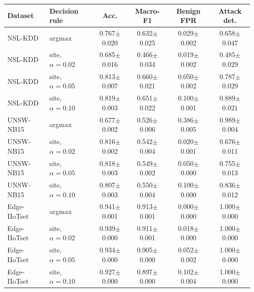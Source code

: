 \begin{tabular}{llcccc}
\toprule
Dataset & Decision rule & Acc. & Macro-F1 & Benign FPR & Attack det. \\
\midrule
NSL-KDD & argmax & 0.767$\pm$0.020 & 0.632$\pm$0.025 & 0.029$\pm$0.002 & 0.658$\pm$0.047 \\
NSL-KDD & site, $\alpha=0.02$ & 0.685$\pm$0.016 & 0.466$\pm$0.034 & 0.019$\pm$0.002 & 0.485$\pm$0.029 \\
NSL-KDD & site, $\alpha=0.05$ & 0.813$\pm$0.007 & 0.660$\pm$0.021 & 0.050$\pm$0.002 & 0.787$\pm$0.029 \\
NSL-KDD & site, $\alpha=0.10$ & 0.819$\pm$0.003 & 0.651$\pm$0.022 & 0.100$\pm$0.001 & 0.889$\pm$0.021 \\
UNSW-NB15 & argmax & 0.677$\pm$0.002 & 0.526$\pm$0.006 & 0.386$\pm$0.005 & 0.989$\pm$0.004 \\
UNSW-NB15 & site, $\alpha=0.02$ & 0.816$\pm$0.002 & 0.542$\pm$0.004 & 0.020$\pm$0.001 & 0.676$\pm$0.011 \\
UNSW-NB15 & site, $\alpha=0.05$ & 0.818$\pm$0.003 & 0.549$\pm$0.002 & 0.050$\pm$0.000 & 0.755$\pm$0.013 \\
UNSW-NB15 & site, $\alpha=0.10$ & 0.807$\pm$0.003 & 0.550$\pm$0.004 & 0.100$\pm$0.000 & 0.836$\pm$0.012 \\
Edge-IIoTset & argmax & 0.941$\pm$0.001 & 0.913$\pm$0.001 & 0.000$\pm$0.000 & 1.000$\pm$0.000 \\
Edge-IIoTset & site, $\alpha=0.02$ & 0.939$\pm$0.000 & 0.911$\pm$0.001 & 0.018$\pm$0.000 & 1.000$\pm$0.000 \\
Edge-IIoTset & site, $\alpha=0.05$ & 0.934$\pm$0.000 & 0.905$\pm$0.000 & 0.052$\pm$0.002 & 1.000$\pm$0.000 \\
Edge-IIoTset & site, $\alpha=0.10$ & 0.927$\pm$0.000 & 0.897$\pm$0.000 & 0.102$\pm$0.004 & 1.000$\pm$0.000 \\
\bottomrule
\end{tabular}
